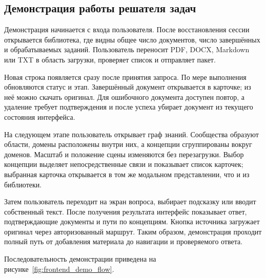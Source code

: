 \subsection{Демонстрация работы решателя задач}

Демонстрация начинается с входа пользователя. После восстановления сессии открывается библиотека, где видны общее число документов, число завершённых и обрабатываемых заданий. Пользователь переносит PDF, DOCX, Markdown или TXT в область загрузки, проверяет список и отправляет пакет.

Новая строка появляется сразу после принятия запроса. По мере выполнения обновляются статус и этап. Завершённый документ открывается в карточке; из неё можно скачать оригинал. Для ошибочного документа доступен повтор, а удаление требует подтверждения и после успеха убирает документ из текущего состояния интерфейса.

На следующем этапе пользователь открывает граф знаний. Сообщества образуют области, домены расположены внутри них, а концепции сгруппированы вокруг доменов. Масштаб и положение сцены изменяются без перезагрузки. Выбор концепции выделяет непосредственные связи и показывает список карточек; выбранная карточка открывается в том же модальном представлении, что и из библиотеки.

Затем пользователь переходит на экран вопроса, выбирает подсказку или вводит собственный текст. После получения результата интерфейс показывает ответ, подтверждающие документы и пути по концепциям. Кнопка источника загружает оригинал через авторизованный маршрут. Таким образом, демонстрация проходит полный путь от добавления материала до навигации и проверяемого ответа.

Последовательность демонстрации приведена на рисунке~\ref{fig:frontend_demo_flow}.


